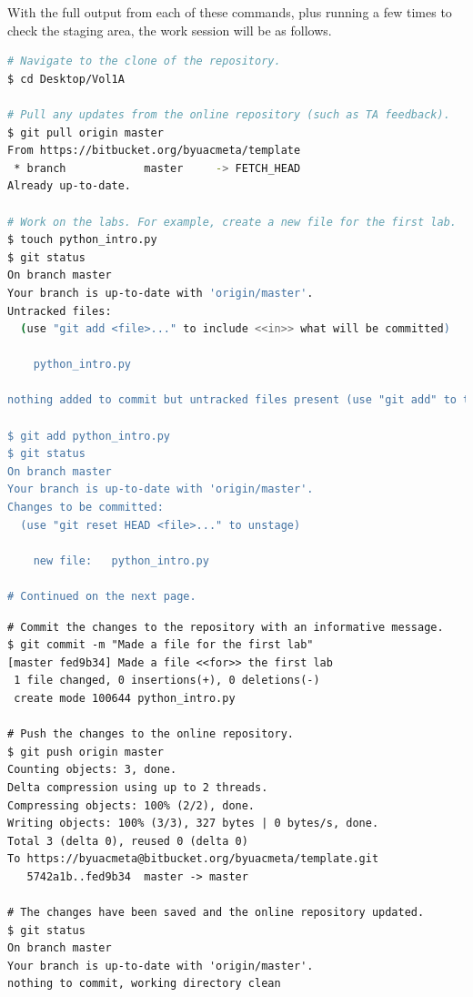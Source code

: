With the full output from each of these commands, plus running  a few times to check the staging area, the work session will be as follows.

\begin{lstlisting}[language=bash]
# Navigate to the clone of the repository.
$ cd Desktop/Vol1A

# Pull any updates from the online repository (such as TA feedback).
$ git pull origin master
From https://bitbucket.org/byuacmeta/template
 * branch            master     -> FETCH_HEAD
Already up-to-date.

# Work on the labs. For example, create a new file for the first lab.
$ touch python_intro.py
$ git status
On branch master
Your branch is up-to-date with 'origin/master'.
Untracked files:
  (use "git add <file>..." to include <<in>> what will be committed)

    python_intro.py

nothing added to commit but untracked files present (use "git add" to track)

$ git add python_intro.py
$ git status
On branch master
Your branch is up-to-date with 'origin/master'.
Changes to be committed:
  (use "git reset HEAD <file>..." to unstage)

    new file:   python_intro.py

# Continued on the next page.
\end{lstlisting}

\newpage

\begin{lstlisting}
# Commit the changes to the repository with an informative message.
$ git commit -m "Made a file for the first lab"
[master fed9b34] Made a file <<for>> the first lab
 1 file changed, 0 insertions(+), 0 deletions(-)
 create mode 100644 python_intro.py

# Push the changes to the online repository.
$ git push origin master
Counting objects: 3, done.
Delta compression using up to 2 threads.
Compressing objects: 100% (2/2), done.
Writing objects: 100% (3/3), 327 bytes | 0 bytes/s, done.
Total 3 (delta 0), reused 0 (delta 0)
To https://byuacmeta@bitbucket.org/byuacmeta/template.git
   5742a1b..fed9b34  master -> master

# The changes have been saved and the online repository updated.
$ git status
On branch master
Your branch is up-to-date with 'origin/master'.
nothing to commit, working directory clean
\end{lstlisting}

